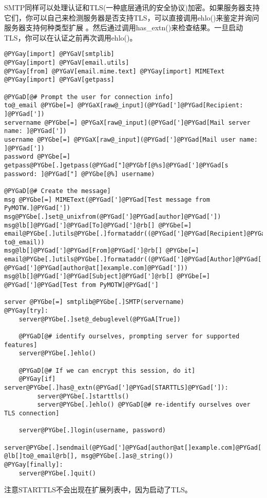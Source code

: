 \documentclass[a4paper,10pt,english]{manual}
\begin{document}
SMTP同样可以处理认证和TLS(一种底层通讯的安全协议)加密。如果服务器支持它们，你可以自己来检测服务器是否支持TLS，可以直接调用ehlo()来鉴定并询问服务器支持何种类型扩展 。然后通过调用has\_extn()来检查结果。一旦启动TLS，你可以在认证之前再次调用ehlo()。

\begin{Verbatim}[commandchars=@\[\]]
@PYGay[import] @PYGaV[smtplib]
@PYGay[import] @PYGaV[email.utils]
@PYGay[from] @PYGaV[email.mime.text] @PYGay[import] MIMEText
@PYGay[import] @PYGaV[getpass]

@PYGaD[@# Prompt the user for connection info]
to@_email @PYGbe[=] @PYGaX[raw@_input](@PYGad[']@PYGad[Recipient: ]@PYGad['])
servername @PYGbe[=] @PYGaX[raw@_input](@PYGad[']@PYGad[Mail server name: ]@PYGad['])
username @PYGbe[=] @PYGaX[raw@_input](@PYGad[']@PYGad[Mail user name: ]@PYGad['])
password @PYGbe[=] getpass@PYGbe[.]getpass(@PYGad["]@PYGbf[@%s]@PYGad[']@PYGad[s password: ]@PYGad["] @PYGbe[@%] username)

@PYGaD[@# Create the message]
msg @PYGbe[=] MIMEText(@PYGad[']@PYGad[Test message from PyMOTW.]@PYGad['])
msg@PYGbe[.]set@_unixfrom(@PYGad[']@PYGad[author]@PYGad['])
msg@lb[]@PYGad[']@PYGad[To]@PYGad[']@rb[] @PYGbe[=] email@PYGbe[.]utils@PYGbe[.]formataddr((@PYGad[']@PYGad[Recipient]@PYGad['], to@_email))
msg@lb[]@PYGad[']@PYGad[From]@PYGad[']@rb[] @PYGbe[=] email@PYGbe[.]utils@PYGbe[.]formataddr((@PYGad[']@PYGad[Author]@PYGad['], @PYGad[']@PYGad[author@at[]example.com]@PYGad[']))
msg@lb[]@PYGad[']@PYGad[Subject]@PYGad[']@rb[] @PYGbe[=] @PYGad[']@PYGad[Test from PyMOTW]@PYGad[']

server @PYGbe[=] smtplib@PYGbe[.]SMTP(servername)
@PYGay[try]:
    server@PYGbe[.]set@_debuglevel(@PYGaA[True])

    @PYGaD[@# identify ourselves, prompting server for supported features]
    server@PYGbe[.]ehlo()

    @PYGaD[@# If we can encrypt this session, do it]
    @PYGay[if] server@PYGbe[.]has@_extn(@PYGad[']@PYGad[STARTTLS]@PYGad[']):
         server@PYGbe[.]starttls()
         server@PYGbe[.]ehlo() @PYGaD[@# re-identify ourselves over TLS connection]

    server@PYGbe[.]login(username, password)
    server@PYGbe[.]sendmail(@PYGad[']@PYGad[author@at[]example.com]@PYGad['], @lb[]to@_email@rb[], msg@PYGbe[.]as@_string())
@PYGay[finally]:
    server@PYGbe[.]quit()
\end{Verbatim}

注意STARTTLS不会出现在扩展列表中，因为启动了TLS。
\end{document}
